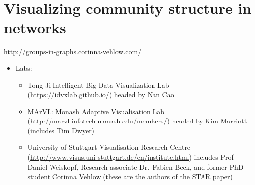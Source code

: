 \hypertarget{visualization}{\section{Visualizing community structure in
networks}\label{visualization}}

\protect\hyperlink{visualization}{}

http://groups-in-graphs.corinna-vehlow.com/

\begin{itemize}
\tightlist
\item
  Labs:

  \begin{itemize}
  \tightlist
  \item
    Tong Ji Intelligent Big Data Visualization Lab
    (\url{https://idvxlab.github.io/}) headed by Nan Cao
  \item
    MArVL: Monash Adaptive Visualisation Lab
    (\url{http://marvl.infotech.monash.edu/members/}) headed by Kim
    Marriott (includes Tim Dwyer)
  \item
    University of Stuttgart Visualisation Research Centre
    (\url{http://www.visus.uni-stuttgart.de/en/institute.html}) includes
    Prof Daniel Weiskopf, Research associate Dr.~Fabien Beck, and former
    PhD student Corinna Vehlow (these are the authors of the STAR paper)
  \end{itemize}
\end{itemize}

